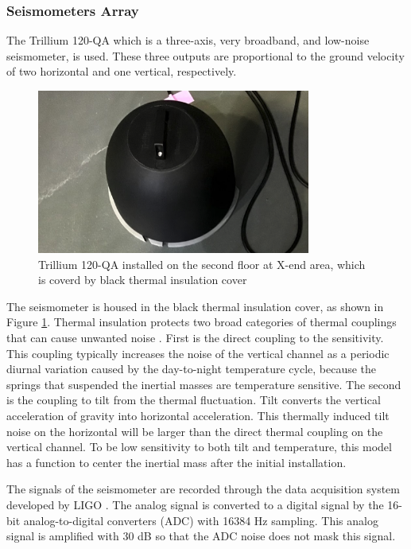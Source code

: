 \subsubsection{Seismometers Array}
The Trillium 120-QA which is a three-axis, very broadband, and low-noise seismometer, is used. These three outputs are proportional to the ground velocity of two horizontal and one vertical, respectively. 

\begin{figure}[h]
  \begin{center}   
    \includegraphics[width=9.0cm]{./img_chap3/img316.png}
    \caption{Trillium 120-QA installed on the second floor at X-end area, which is coverd by black thermal insulation cover}\label{img:img316}
  \end{center}
\end{figure}

The seismometer is housed in the black thermal insulation cover, as shown in Figure \ref{img:img316}. Thermal insulation protects two broad categories of thermal couplings that can cause unwanted noise \cite{trillium120manual}. First is the direct coupling to the sensitivity. This coupling typically increases the noise of the vertical channel as a periodic diurnal variation caused by the day-to-night temperature cycle, because the springs that suspended the inertial masses are temperature sensitive. The second is the coupling to tilt from the thermal fluctuation. Tilt converts the vertical acceleration of gravity into horizontal acceleration. This thermally induced tilt noise on the horizontal will be larger than the direct thermal coupling on the vertical channel. To be low sensitivity to both tilt and temperature, this model has a function to center the inertial mass after the initial installation.

The signals of the seismometer are recorded through the data acquisition system developed by LIGO \cite{bork2001overview}. The analog signal is converted to a digital signal by the 16-bit analog-to-digital converters (ADC) with 16384 $\mathrm{Hz}$ sampling. This analog signal is amplified with 30 dB so that the ADC noise does not mask this signal. 


